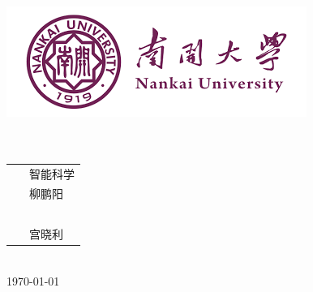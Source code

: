 \documentclass[]{ctexrep}
\begin{document}
\begin{titlepage}
	\begin{center}
		\includegraphics[scale=1]{figure/NKU.png}\\
		\vspace{3cm}
		\textbf{}\\[1cm]
		\textbf{}\\
		\vspace{\fill}
		{\songti{}
			\begin{tabular}{rl}
			    {\makebox[4\ccwd][s]{专\qquad 业：}}& ~\kaishu 智能科学\\
			    
			    {\makebox[4\ccwd][s]{姓\qquad 名：}}& ~\kaishu 柳鹏阳 \\
			    
			    {\makebox[4\ccwd][s]{学\qquad 号：}}& ~\kaishu 1511305 \\
			    {\makebox[4\ccwd][s]{指导老师:}}&~\kaishu 宫晓利\\
			\end{tabular}
			}\\[2cm]
			\vspace{\fill}
			\today 
					
	\end{center}
\end{titlepage}

\tableofcontents
\end{document}
